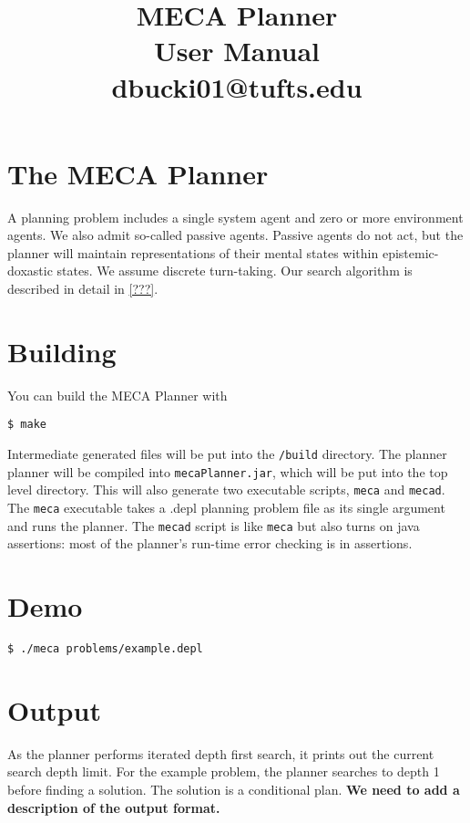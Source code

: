 \documentclass{article}
\title{MECA Planner  \\
\large User Manual \\
dbucki01@tufts.edu
}
\begin{document}
\maketitle

\tableofcontents


\section{The MECA Planner}

A planning problem includes a single system agent and zero or more environment
agents.  We also admit so-called passive agents. Passive agents do not act, but
the planner will maintain representations of their mental states within
epistemic-doxastic states.  We assume discrete turn-taking.  Our search
algorithm is described in detail in \ref{???}.


\section{Building}


You can build the MECA Planner with

\begin{lstlisting}
$ make
\end{lstlisting}

Intermediate generated files will be put into the \verb|/build| directory. 
The planner planner will be compiled into \verb|mecaPlanner.jar|, which
will be put into the top level directory. This will also generate two
executable scripts, \verb|meca| and \verb|mecad|.
The \verb|meca| executable takes a .depl planning problem file as its single
argument and runs the planner. The \verb|mecad| script is like \verb|meca| but
also turns on java assertions: most of the planner's run-time error checking is
in assertions.


\section{Demo}

\begin{lstlisting}
$ ./meca problems/example.depl
\end{lstlisting}


\section{Output}

As the planner performs iterated depth first search, it prints out the current
search depth limit. For the example problem, the planner searches to depth 1
before finding a solution.
The solution is a conditional plan.
\textbf{We need to add a description of the output format.}
\end{document}
